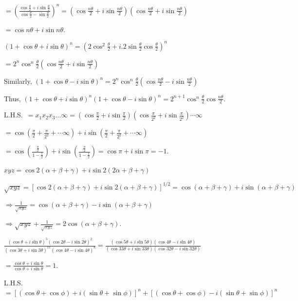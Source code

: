   $= \left(\frac{\cos\frac{\theta}{2} + i\sin\frac{\theta}{2}}{\cos\frac{\theta}{2} -
    \sin\frac{\theta}{2}}\right)^n = \left(\cos\frac{n\theta}{2} +
  i\sin\frac{n\theta}{2}\right)\left(\cos\frac{n\theta}{2} + i\sin\frac{n\theta}{2}\right)$

  $= \cos n\theta + i\sin n\theta$.
\item $(1 + \cos\theta + i\sin\theta)^n = \left(2\cos^2\frac{\theta}{2} +
  i.2\sin\frac{\theta}{2}\cos\frac{\theta}{2}\right)^n$

  $= 2^n\cos^n\frac{\theta}{2}\left(\cos\frac{n\theta}{2} + i\sin\frac{n\theta}{2}\right)$

  Similarly, $(1 + \cos\theta - i\sin\theta)^n = 2^n\cos^n\frac{\theta}{2}\left(\cos\frac{n\theta}{2} -
  i\sin\frac{n\theta}{2}\right)$

  Thus, $(1 + \cos\theta + i\sin\theta)^n(1 + \cos\theta - i\sin\theta)^n = 2^{n +
    1}\cos^n\frac{\theta}{2}\cos\frac{n\theta}{2}$.
\item L.H.S.\ $= x_1x_2x_3\ldots \infty = \left(\cos\frac{\pi}{2} +
  i\sin\frac{\pi}{2}\right)\left(\cos\frac{\pi}{2^2} + i\sin\frac{\pi}{2^2}\right)\cdots \infty$

  $= \cos\left(\frac{\pi}{2} + \frac{\pi}{2^2} + \cdots \infty\right) + i\sin\left(\frac{\pi}{2}
  + \frac{\pi}{2^2} + \cdots \infty\right)$

  $= \cos\left(\frac{\frac{\pi}{2}}{1 - \frac{1}{2}}\right) + i\sin\left(\frac{\frac{\pi}{2}}{1
    - \frac{1}{2}}\right) = \cos\pi + i\sin\pi = -1$.
\item $xyz = \cos2(\alpha + \beta + \gamma) + i\sin2(2\alpha + \beta + \gamma)$

  $\sqrt{xyz} = [\cos2(\alpha + \beta + \gamma) + i\sin2(\alpha + \beta + \gamma)]^{1/2} = \cos(\alpha
  + \beta + \gamma) + i\sin(\alpha + \beta + \gamma)$

  $\Rightarrow \frac{1}{\sqrt{xyz}} = \cos(\alpha + \beta + \gamma) - i\sin(\alpha + \beta + \gamma)$

  $\Rightarrow \sqrt{xyz} + \frac{1}{\sqrt{xyz}} = 2\cos(\alpha + \beta + \gamma)$.
\item $\frac{(\cos\theta + i\sin\theta)^5(\cos2\theta - i\sin2\theta)^2}{(\cos3\theta +
  i\sin3\theta)^{11}(\cos4\theta - i\sin4\theta)^8} = \frac{(\cos5\theta + i\sin5\theta)(\cos4\theta -
  i\sin4\theta)}{(\cos33\theta + i\sin33\theta)(\cos32\theta - i\sin32\theta)}$

  $= \frac{\cos\theta + i\sin\theta}{\cos\theta + i\sin\theta} = 1$.
\item L.H.S.\ $= [(\cos\theta +\cos\phi) + i(\sin\theta + \sin\phi)]^n + [(\cos\theta + \cos\phi) -
  i(\sin\theta + \sin\phi)]^n$

